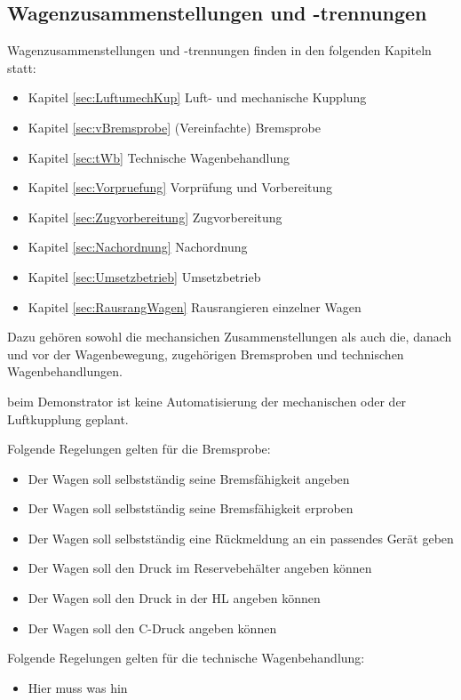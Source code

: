 \subsection{Wagenzusammenstellungen und -trennungen}
Wagenzusammenstellungen und -trennungen finden in den folgenden Kapiteln statt:
\begin{itemize}
    \item Kapitel \ref{sec:LuftumechKup} Luft- und mechanische Kupplung
    \item Kapitel \ref{sec:vBremsprobe} (Vereinfachte) Bremsprobe
    \item Kapitel \ref{sec:tWb} Technische Wagenbehandlung
    \item Kapitel \ref{sec:Vorpruefung} Vorprüfung und Vorbereitung
    \item Kapitel \ref{sec:Zugvorbereitung} Zugvorbereitung
    \item Kapitel \ref{sec:Nachordnung} Nachordnung
    \item Kapitel \ref{sec:Umsetzbetrieb} Umsetzbetrieb
    \item Kapitel \ref{sec:RausrangWagen} Rausrangieren einzelner Wagen
\end{itemize}
Dazu gehören sowohl die mechansichen Zusammenstellungen als auch die, danach und vor der Wagenbewegung, zugehörigen Bremsproben und technischen Wagenbehandlungen.\par
beim Demonstrator ist keine Automatisierung der mechanischen oder der Luftkupplung geplant.\par
Folgende Regelungen gelten für die Bremsprobe:
\begin{itemize}
    \item Der Wagen soll selbstständig seine Bremsfähigkeit angeben
    \item Der Wagen soll selbstständig seine Bremsfähigkeit erproben
    \item Der Wagen soll selbstständig eine Rückmeldung an ein passendes Gerät geben
    \item Der Wagen soll den Druck im Reservebehälter angeben können
    \item Der Wagen soll den Druck in der HL angeben können
    \item Der Wagen soll den C-Druck angeben können
\end{itemize}
Folgende Regelungen gelten für die technische Wagenbehandlung:
\begin{itemize}
    \item Hier muss was hin
\end{itemize}
